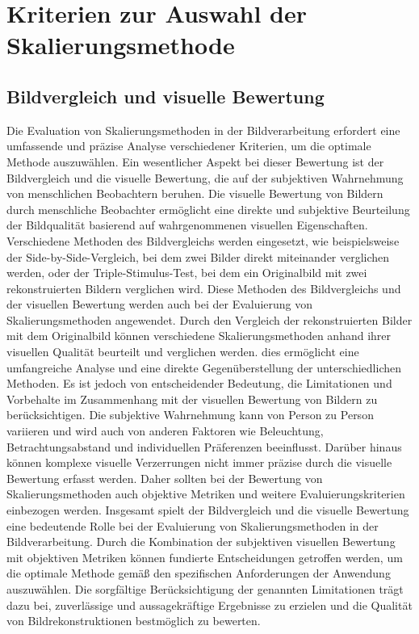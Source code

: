 \section{Kriterien zur Auswahl der Skalierungsmethode} %

    \subsection{Bildvergleich und visuelle Bewertung}
        
        Die Evaluation von Skalierungsmethoden in der Bildverarbeitung erfordert eine umfassende und präzise Analyse verschiedener Kriterien, um die optimale Methode auszuwählen. 
        Ein wesentlicher Aspekt bei dieser Bewertung ist der Bildvergleich und die visuelle Bewertung, die auf der subjektiven Wahrnehmung von menschlichen Beobachtern beruhen.
        Die visuelle Bewertung von Bildern durch menschliche Beobachter ermöglicht eine direkte und subjektive Beurteilung der Bildqualität basierend auf wahrgenommenen visuellen Eigenschaften. 
        Verschiedene Methoden des Bildvergleichs werden eingesetzt, wie beispielsweise der Side-by-Side-Vergleich, bei dem zwei Bilder direkt miteinander verglichen werden, oder der Triple-Stimulus-Test, bei dem ein Originalbild mit zwei rekonstruierten Bildern verglichen wird.
        Diese Methoden des Bildvergleichs und der visuellen Bewertung werden auch bei der Evaluierung von Skalierungsmethoden angewendet. 
        Durch den Vergleich der rekonstruierten Bilder mit dem Originalbild können verschiedene Skalierungsmethoden anhand ihrer visuellen Qualität beurteilt und verglichen werden. 
        dies ermöglicht eine umfangreiche Analyse und eine direkte Gegenüberstellung der unterschiedlichen Methoden.
        Es ist jedoch von entscheidender Bedeutung, die Limitationen und Vorbehalte im Zusammenhang mit der visuellen Bewertung von Bildern zu berücksichtigen. 
        Die subjektive Wahrnehmung kann von Person zu Person variieren und wird auch von anderen Faktoren wie Beleuchtung, Betrachtungsabstand und individuellen Präferenzen beeinflusst. 
        Darüber hinaus können komplexe visuelle Verzerrungen nicht immer präzise durch die visuelle Bewertung erfasst werden. 
        Daher sollten bei der Bewertung von Skalierungsmethoden auch objektive Metriken und weitere Evaluierungskriterien einbezogen werden.
        Insgesamt spielt der Bildvergleich und die visuelle Bewertung eine bedeutende Rolle bei der Evaluierung von Skalierungsmethoden in der Bildverarbeitung.
        Durch die Kombination der subjektiven visuellen Bewertung mit objektiven Metriken können fundierte Entscheidungen getroffen werden, um die optimale Methode gemäß den spezifischen Anforderungen der Anwendung auszuwählen. 
        Die sorgfältige Berücksichtigung der genannten Limitationen trägt dazu bei, zuverlässige und aussagekräftige Ergebnisse zu erzielen und die Qualität von Bildrekonstruktionen bestmöglich zu bewerten.
    
